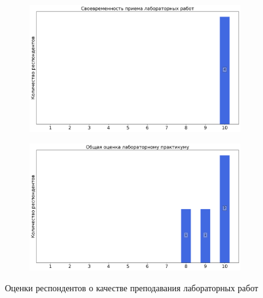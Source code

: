 \begin{figure}[H]
\begin{subfigure}[b]{0.45\textwidth}
				\includegraphics[width=\textwidth]{images/2 course/Общая физика - электричество и магнетизм/labniks-marks-Смирнова О.И.-2.png}
			\end{subfigure}
			\begin{subfigure}[b]{0.45\textwidth}
				\centering
				\includegraphics[width=\textwidth]{images/2 course/Общая физика - электричество и магнетизм/labniks-marks-Смирнова О.И.-3.png}
			\end{subfigure}	
			\caption{Оценки респондентов о качестве преподавания лабораторных работ}
		\end{figure}


